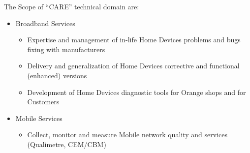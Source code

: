The Scope of ``CARE'' technical domain are:
\begin{itemize}
	\item Broadband Services
	\begin{itemize}
		\item Expertise and management of in-life Home Devices problems and bugs fixing with manufacturers
		\item Delivery and generalization of Home Devices corrective and functional (enhanced) versions
		\item Development of Home Devices diagnostic tools for Orange shops and for Customers
	\end{itemize}
	\item Mobile Services
	\begin{itemize}
		\item Collect, monitor and measure Mobile network quality and services (Qualimetre, CEM/CBM)
	\end{itemize}
\end{itemize}
